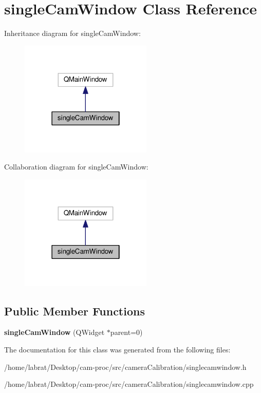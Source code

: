 \hypertarget{classsingleCamWindow}{}\section{single\+Cam\+Window Class Reference}
\label{classsingleCamWindow}


Inheritance diagram for single\+Cam\+Window\+:\nopagebreak
\begin{figure}[H]
\begin{center}
\leavevmode
\includegraphics[width=178pt]{classsingleCamWindow__inherit__graph}
\end{center}
\end{figure}


Collaboration diagram for single\+Cam\+Window\+:\nopagebreak
\begin{figure}[H]
\begin{center}
\leavevmode
\includegraphics[width=178pt]{classsingleCamWindow__coll__graph}
\end{center}
\end{figure}
\subsection*{Public Member Functions}
\begin{DoxyCompactItemize}
\item 
{\bfseries single\+Cam\+Window} (Q\+Widget $\ast$parent=0)\hypertarget{classsingleCamWindow_a4b869dfeda9defb8b283a7671c39a2bc}{}\label{classsingleCamWindow_a4b869dfeda9defb8b283a7671c39a2bc}

\end{DoxyCompactItemize}


The documentation for this class was generated from the following files\+:\begin{DoxyCompactItemize}
\item 
/home/labrat/\+Desktop/cam-\/proc/src/camera\+Calibration/singlecamwindow.\+h\item 
/home/labrat/\+Desktop/cam-\/proc/src/camera\+Calibration/singlecamwindow.\+cpp\end{DoxyCompactItemize}
